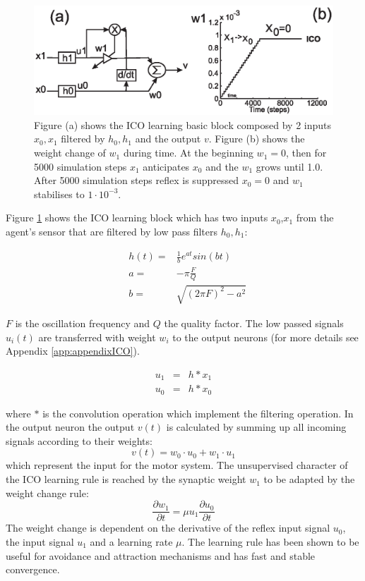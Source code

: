 \begin{figure}[htbp]
\begin{center}
\includegraphics[scale=0.5]{figures/socialadapt/ico.eps}
\caption[Agent learns with the ICO learning]{Figure (a) shows the ICO learning basic
block composed by 2 inputs $x_{0},x_{1}$ filtered by $h_{0},h_{1}$ and the output $v$.
Figure (b) shows the weight change of $w_{1}$ during time. At the beginning $w_{1}=0$,
then for 5000 simulation steps $x_{1}$ anticipates $x_{0}$ and the $w_{1}$ grows until 1.0.
After 5000 simulation steps reflex is suppressed $x_{0}=0$ and $w_{1}$ stabilises to $1 \cdot 10^{-3}$.
\label{fig:ico}}
\end{center}
\end{figure}

Figure \ref{fig:ico} shows the ICO learning block which has two inputs $x_{0}$,$x_{1}$
from the agent's sensor that are filtered by low pass filters $h_{0},h_{1}$:

\begin{eqnarray}
&h(t)=&\frac{1}{b}e^{at}sin(bt) \label{eq:1}\\
&a   =&-\pi \frac{F}{Q} \label{eq:F}\\
&b   =&\sqrt{(2\pi F)^2 -a^{2}} \label{eq:Q}
\end{eqnarray}

$F$ is the oscillation frequency and $Q$ the quality factor. The low passed
signals $u_{i}(t)$ are transferred with weight $w_{i}$ to the output
neurons (for more details see Appendix \ref{app:appendixICO}).

\begin{eqnarray}
u_1 &=& h \ast x_1 \\
u_0 &=& h \ast x_0
\end{eqnarray}

where $\ast$ is the convolution operation which implement the filtering operation.
In the output neuron the output $v(t)$ is calculated by
summing up all incoming signals according to their weights:
\begin{equation}
v(t)=w_{0}\cdot u_{0}+w_{1}\cdot u_{1}
\end{equation}
which represent the input for the motor system.
The unsupervised character of the ICO learning rule is reached by
the synaptic weight $w_{1}$ to be adapted by the weight
change rule:
\begin{equation}
\frac{\partial w_{1}}{\partial t}=\mu u_{1} \frac{\partial u_{0}}{\partial t}
\end{equation}
The weight change is dependent on the derivative of the reflex input
signal $u_{0}$, the input signal $u_{1}$ and a
learning rate $\mu$. The
learning rule has been shown to be useful for avoidance and attraction
mechanisms and has fast and stable convergence.


